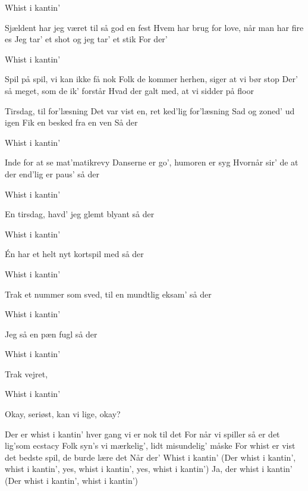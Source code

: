 \documentclass[a4paper,11pt]{article}
\begin{document}
\begin{song}
%
Whist i kantin’

%
Sjældent har jeg været til så god en fest
Hvem har brug for love, når man har fire es
Jeg tar’ et shot og jeg tar’ et stik
For der’

%
Whist i kantin’

%
Spil på spil, vi kan ikke få nok
Folk de kommer herhen, siger at vi bør stop
Der’ så meget, som de ik’ forstår
Hvad der galt med, at vi sidder på floor


%
Tirsdag, til for’læsning
Det var vist en, ret ked’lig for’læsning
Sad og zoned’ ud igen
Fik en besked fra en ven
Så der

%
Whist i kantin’

%
Inde for at se mat’matikrevy
Danserne er go’, humoren er syg
Hvornår sir’ de at der end’lig er paus’
så der

%
Whist i kantin’

%
En tirsdag, havd’ jeg glemt blyant
så der 

%
Whist i kantin’

%
Én har et helt nyt kortspil med 
så der

%
Whist i kantin’

%
Trak et nummer som sved, til en mundtlig eksam’ 
så der

%
Whist i kantin’

%
Jeg så en pæn fugl 
så der

%
Whist i kantin’

%
Trak vejret, 

%
Whist i kantin’

%
Okay, seriøst, kan vi lige, okay?

%
Der er whist i kantin’ hver gang vi er nok til det
For når vi spiller så er det lig’som ecstacy
Folk syn’s vi mærkelig’, lidt misundelig’ måske
For whist er vist det bedste spil, de burde lære det
Når der’
Whist i kantin’
(Der whist i kantin’, whist i kantin’, yes, whist i kantin’, yes, whist i kantin’)
Ja, der whist i kantin’
(Der whist i kantin’, whist i kantin’)


\end{song}
\end{document}
